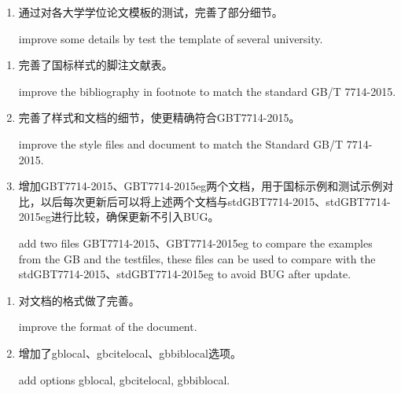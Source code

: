 

\label{up:190207}
\begin{enumerate}

\item 通过对各大学学位论文模板的测试，完善了部分细节。

improve some details by test the template of several university.

\end{enumerate}

\label{up:190119}
\begin{enumerate}

\item 完善了国标样式的脚注文献表。

improve the bibliography in footnote to match the standard GB/T 7714-2015.

\item 完善了样式和文档的细节，使更精确符合GBT7714-2015。

improve the style files and document to match the Standard GB/T 7714-2015.

\item 增加GBT7714-2015、GBT7714-2015eg两个文档，用于国标示例和测试示例对比，以后每次更新后可以将上述两个文档与stdGBT7714-2015、stdGBT7714-2015eg进行比较，确保更新不引入BUG。

add two files GBT7714-2015、GBT7714-2015eg to compare the examples from the GB and the testfiles, these files can be used to compare with the stdGBT7714-2015、stdGBT7714-2015eg to avoid BUG after update.


\end{enumerate}


\label{up:181222}
\begin{enumerate}

\item 对文档的格式做了完善。

improve the format of the document.

\item 增加了gblocal、gbcitelocal、gbbiblocal选项。

add options gblocal, gbcitelocal, gbbiblocal.


\end{enumerate}



